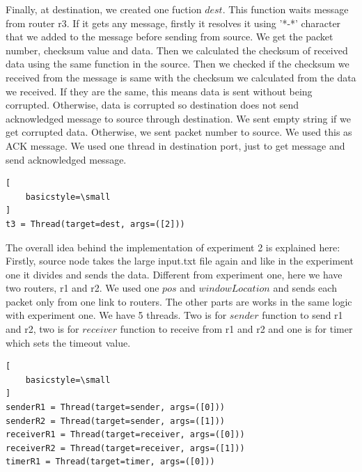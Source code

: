 \documentclass[conference]{IEEEtran}
\begin{document}
Finally, at destination, we created one fuction $dest$. This function waits message from router r3. If it gets any message, firstly it resolves it using '*-*' character that we added to the message before sending from source. We get the packet number, checksum value and data. Then we calculated the checksum of received data using the same function in the source. Then we checked if the checksum we received from the message is same with the checksum we calculated from the data we received. If they are the same, this means data is sent without being corrupted. Otherwise, data is corrupted so destination does not send acknowledged message to source through destination. We sent empty string if we get corrupted data. Otherwise, we sent packet number to source. We used this as ACK message. We used one thread in destination port, just to get message and send acknowledged message.
\begin{lstlisting}[
    basicstyle=\small
]
t3 = Thread(target=dest, args=([2]))
\end{lstlisting}


The overall idea behind the implementation of experiment 2 is explained here: Firstly, source node takes the large input.txt file again and like in the experiment one it divides and sends the data. Different from experiment one, here we have two routers, r1 and r2. We used one $pos$ and $windowLocation$ and sends each packet only from one link to routers. The other parts are works in the same logic with experiment one. We have 5 threads. Two is for $sender$ function to send r1 and r2, two is for $receiver$ function to receive from r1 and r2 and one is for timer which sets the timeout value. 

\begin{lstlisting}[
    basicstyle=\small
]
senderR1 = Thread(target=sender, args=([0]))
senderR2 = Thread(target=sender, args=([1]))
receiverR1 = Thread(target=receiver, args=([0]))
receiverR2 = Thread(target=receiver, args=([1]))
timerR1 = Thread(target=timer, args=([0]))
\end{lstlisting}
\end{document}

